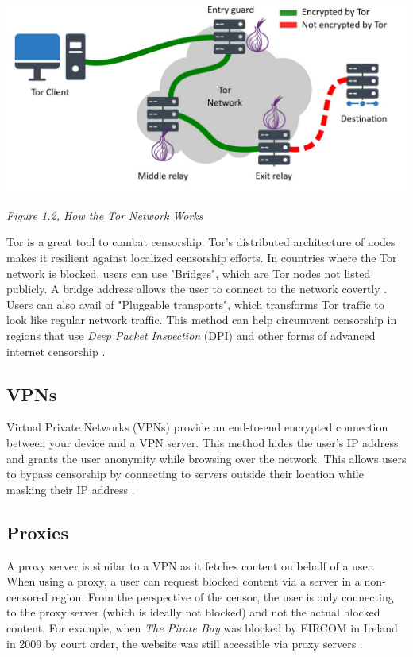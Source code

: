 \centerline{\includegraphics[width=480pt]{Griff/TCD SCSS CAPSTONE/Literature Review/How tor works.jpg}}

\centerline{\textit{Figure 1.2, How the Tor Network Works}}

Tor is a great tool to combat censorship. Tor's distributed architecture of nodes makes it resilient against localized censorship efforts. In countries where the Tor network is blocked, users can use "Bridges", which are Tor nodes not listed publicly. A bridge address allows the user to connect to the network covertly \cite{torprojectBRIDGESProject}. Users can also avail of "Pluggable transports", which transforms Tor traffic to look like regular network traffic. This method can help circumvent censorship in regions that use \textit{Deep Packet Inspection} (DPI) and other forms of advanced internet censorship \cite{torprojectCIRCUMVENTIONProject}.

\subsection{VPNs}

Virtual Private Networks (VPNs) provide an end-to-end encrypted connection between your device and a VPN server. This method hides the user's IP address and grants the user anonymity while browsing over the network. This allows users to bypass censorship by connecting to servers outside their location while masking their IP address \cite{TomsGuideVPN}.

\subsection{Proxies}

A proxy server is similar to a VPN as it fetches content on behalf of a user. When using a proxy, a user can request blocked content via a server in a non-censored region. From the perspective of the censor, the user is only connecting to the proxy server (which is ideally not blocked) and not the actual blocked content. For example, when \textit{The Pirate Bay} was blocked by EIRCOM in Ireland in 2009 by court order, the website was still accessible via proxy servers \cite{PirateBayBlocked2009}.

